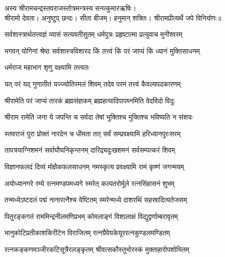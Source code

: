 
अस्य श्रीरामचन्द्रस्तवराजस्तोत्रमन्त्रस्य सनत्कुमारऋषिः। \\
श्रीरामो देवता। अनुष्टुप् छन्दः। सीता बीजम्। हनुमान् शक्तिः।
श्रीरामप्रीत्यर्थे जपे विनियोगः॥


\twolineshloka
{सर्वशास्त्रार्थतत्त्वज्ञं व्यासं सत्यवतीसुतम्}
{धर्मपुत्रः प्रहृष्टात्मा प्रत्युवाच मुनीश्वरम्}%


\twolineshloka
{भगवन् योगिनां श्रेष्ठ सर्वशास्त्रविशारद}
{किं तत्त्वं किं परं जाप्यं किं ध्यानं मुक्तिसाधनम्}%


\onelineshloka
{धर्मराज महाभाग शृणु वक्ष्यामि तत्त्वतः}%

\twolineshloka
{यत् परं यद् गुणातीतं यज्ज्योतिरमलं शिवम्}
{तदेव परमं तत्त्वं कैवल्यपदकारणम्}%

\twolineshloka
{श्रीरामेति परं जाप्यं तारकं ब्रह्मसंज्ञकम्}
{ब्रह्महत्यादिपापघ्नमिति वेदविदो विदुः}%

\twolineshloka
{श्रीराम रामेति जना ये जपन्ति च सर्वदा}
{तेषां भुक्तिश्च मुक्तिश्च भविष्यति न संशयः}%

\twolineshloka
{स्तवराजं पुरा प्रोक्तं नारदेन च धीमता}
{तत् सर्वं सम्प्रवक्ष्यामि हरिध्यानपुरःसरम्}%

\twolineshloka
{तापत्रयाग्निशमनं सर्वाघौघनिकृन्तनम्}
{दारिद्र्यदुःखशमनं सर्वसम्पत्करं शिवम्}%

\twolineshloka
{विज्ञानफलदं दिव्यं मोक्षैकफलसाधनम्}
{नमस्कृत्य प्रवक्ष्यामि रामं कृष्णं जगन्मयम्}%

\twolineshloka
{अयोध्यानगरे रम्ये रत्नमण्डपमध्यगे}
{स्मरेत् कल्पतरोर्मूले रत्नसिंहासनं शुभम्}%

\twolineshloka
{तन्मध्येऽष्टदलं पद्मं नानारत्नैश्च वेष्टितम्}
{स्मरेन्मध्ये दाशरथिं सहस्रादित्यतेजसम्}%

\twolineshloka
{पितुरङ्कगतं राममिन्द्रनीलमणिप्रभम्}
{कोमलाङ्गं विशालाक्षं विद्युद्वर्णाम्बरावृतम्}%

\twolineshloka
{भानुकोटिप्रतीकाशकिरीटेन विराजितम्}
{रत्नग्रैवेयकेयूररत्नकुण्डलमण्डितम्}%

\twolineshloka
{रत्नकङ्कणमञ्जीरकटिसूत्रैरलङ्कृतम्}
{श्रीवत्सकौस्तुभोरस्कं मुक्ताहारोपशोभितम्}%

